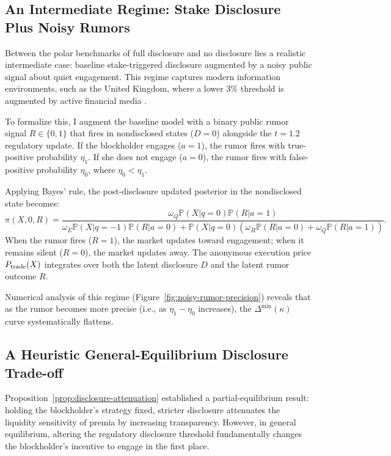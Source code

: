 \documentclass[11pt]{article}
\newcommand{\PP}{\mathbb{P}}
\newcommand{\1}{\mathbf{1}}
\begin{document}
%
\subsection{An Intermediate Regime: Stake Disclosure Plus Noisy Rumors}
\label{sec:noisy_rumors}
%

Between the polar benchmarks of full disclosure and no disclosure lies a realistic intermediate case: baseline stake-triggered disclosure augmented by a noisy public signal about quiet engagement. This regime captures modern information environments, such as the United Kingdom, where a lower 3\% threshold is augmented by active financial media \citep{FangPeress2009}.

To formalize this, I augment the baseline model with a binary public rumor signal $R \in \{0,1\}$ that fires in nondisclosed states ($D=0$) alongside the $t=1.2$ regulatory update. If the blockholder engages ($a=1$), the rumor fires with true-positive probability $\eta_1$. If she does not engage ($a=0$), the rumor fires with false-positive probability $\eta_0$, where $\eta_0 < \eta_1$.

Applying Bayes' rule, the post-disclosure updated posterior in the nondisclosed state becomes:
\begin{equation}
\pi(X,0,R) = \frac{\omega_Q \PP(X|q=0) \PP(R|a=1)}{\omega_E \PP(X|q=-1)\PP(R|a=0) + \PP(X|q=0)(\omega_H \PP(R|a=0) + \omega_Q \PP(R|a=1))}.
\end{equation}
When the rumor fires ($R=1$), the market updates toward engagement; when it remains silent ($R=0$), the market updates away. The anonymous execution price $P_{\textup{trade}}(X)$ integrates over both the latent disclosure $D$ and the latent rumor outcome $R$.

Numerical analysis of this regime (Figure~\ref{fig:noisy-rumor-precision}) reveals that as the rumor becomes more precise (i.e., as $\eta_1 - \eta_0$ increases), the $\Delta^{\min}(\kappa)$ curve systematically flattens.

%
\subsection{A Heuristic General-Equilibrium Disclosure Trade-off}
\label{sec:ge_disclosure}
%

Proposition~\ref{prop:disclosure-attenuation} established a partial-equilibrium result: holding the blockholder's strategy fixed, stricter disclosure attenuates the liquidity sensitivity of premia by increasing transparency. However, in general equilibrium, altering the regulatory disclosure threshold fundamentally changes the blockholder's incentive to engage in the first place.
\end{document}
